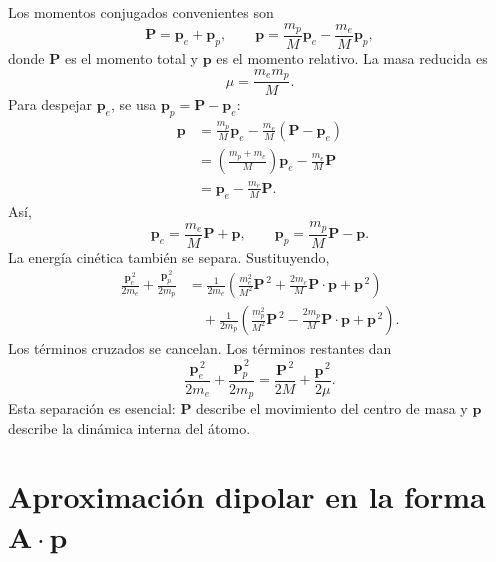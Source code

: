 \documentclass[11pt]{article}
\newcommand{\vb}[1]{\mathbf{#1}}
\begin{document}
Los momentos conjugados convenientes son
\begin{equation}
  \vb P=\vb p_e+\vb p_p,
  \qquad
  \vb p
  =
  \frac{m_p}{M}\vb p_e
  -
  \frac{m_e}{M}\vb p_p,
\end{equation}
donde \(\vb P\) es el momento total y \(\vb p\) es el momento relativo. La masa
reducida es
\begin{equation}
  \mu
  =
  \frac{m_em_p}{M}.
\end{equation}
Para despejar \(\vb p_e\), se usa \(\vb p_p=\vb P-\vb p_e\):
\begin{align}
  \vb p
  &=
  \frac{m_p}{M}\vb p_e
  -
  \frac{m_e}{M}(\vb P-\vb p_e)                                                 \\
  &=
  \left(\frac{m_p+m_e}{M}\right)\vb p_e
  -
  \frac{m_e}{M}\vb P                                                           \\
  &=
  \vb p_e-\frac{m_e}{M}\vb P.
\end{align}
As\'i,
\begin{equation}
  \vb p_e
  =
  \frac{m_e}{M}\vb P+\vb p,
  \qquad
  \vb p_p
  =
  \frac{m_p}{M}\vb P-\vb p.
\end{equation}
La energ\'ia cin\'etica tambi\'en se separa. Sustituyendo,
\begin{align}
  \frac{\vb p_e^{\,2}}{2m_e}
  +
  \frac{\vb p_p^{\,2}}{2m_p}
  &=
  \frac{1}{2m_e}
  \left(
    \frac{m_e^2}{M^2}\vb P^{\,2}
    +
    \frac{2m_e}{M}\vb P\cdot\vb p
    +
    \vb p^{\,2}
  \right)                                                                     \\
  &\quad
  +
  \frac{1}{2m_p}
  \left(
    \frac{m_p^2}{M^2}\vb P^{\,2}
    -
    \frac{2m_p}{M}\vb P\cdot\vb p
    +
    \vb p^{\,2}
  \right).
\end{align}
Los t\'erminos cruzados se cancelan. Los t\'erminos restantes dan
\begin{equation}
  \frac{\vb p_e^{\,2}}{2m_e}
  +
  \frac{\vb p_p^{\,2}}{2m_p}
  =
  \frac{\vb P^{\,2}}{2M}
  +
  \frac{\vb p^{\,2}}{2\mu}.
\end{equation}
Esta separaci\'on es esencial: \(\vb P\) describe el movimiento del centro de
masa y \(\vb p\) describe la din\'amica interna del \'atomo.

\section{Aproximaci\'on dipolar en la forma \texorpdfstring{\(\vb A\cdot\vb p\)}{A.p}}
\end{document}
